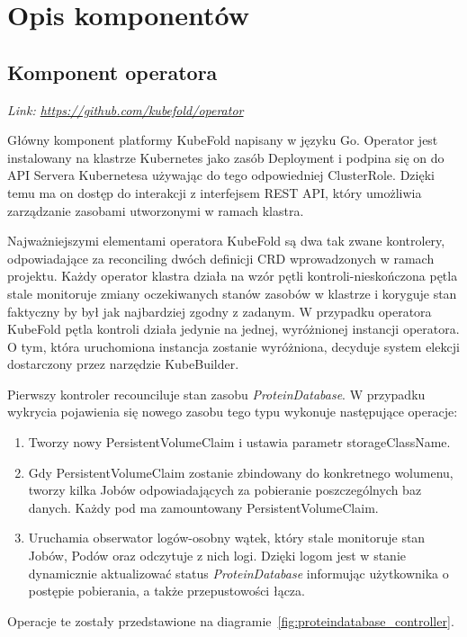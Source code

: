 \section{Opis komponentów}

\subsection{Komponent operatora}\label{subsec:component-operator}
\textit{Link: \url{https://github.com/kubefold/operator}}

Główny komponent platformy KubeFold napisany w języku Go.
Operator jest instalowany na klastrze Kubernetes jako zasób Deployment i podpina się on do API Servera Kubernetesa używając do tego odpowiedniej ClusterRole.
Dzięki temu ma on dostęp do interakcji z interfejsem REST API, który umożliwia zarządzanie zasobami utworzonymi w ramach klastra.

Najważniejszymi elementami operatora KubeFold są dwa tak zwane kontrolery, odpowiadające za reconciling dwóch definicji CRD wprowadzonych w ramach projektu.
Każdy operator klastra działa na wzór pętli kontroli-nieskończona pętla stale monitoruje zmiany oczekiwanych stanów zasobów w klastrze i koryguje stan faktyczny by był jak najbardziej zgodny z zadanym.
W przypadku operatora KubeFold pętla kontroli działa jedynie na jednej, wyróżnionej instancji operatora.
O tym, która uruchomiona instancja zostanie wyróżniona, decyduje system elekcji dostarczony przez narzędzie KubeBuilder.

Pierwszy kontroler recounciluje stan zasobu \textit{ProteinDatabase}.
W przypadku wykrycia pojawienia się nowego zasobu tego typu wykonuje następujące operacje:
\begin{enumerate}
    \item Tworzy nowy PersistentVolumeClaim i ustawia parametr storageClassName.
    \item Gdy PersistentVolumeClaim zostanie zbindowany do konkretnego wolumenu, tworzy kilka Jobów odpowiadających za pobieranie poszczególnych baz danych.
    Każdy pod ma zamountowany PersistentVolumeClaim.
    \item Uruchamia obserwator logów-osobny wątek, który stale monitoruje stan Jobów, Podów oraz odczytuje z nich logi.
    Dzięki logom jest w stanie dynamicznie aktualizować status \textit{ProteinDatabase} informując użytkownika o postępie pobierania, a także przepustowości łącza.
\end{enumerate}
Operacje te zostały przedstawione na diagramie~\ref{fig:proteindatabase_controller}.

